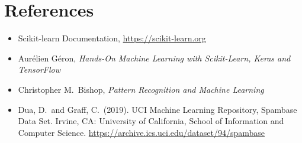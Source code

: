 \documentclass[11pt]{article}
\begin{document}
\section*{References}
\begin{itemize}
    \item Scikit-learn Documentation, \url{https://scikit-learn.org}
    \item Aur\'elien G\'eron, \emph{Hands-On Machine Learning with Scikit-Learn, Keras
    and TensorFlow}
    \item Christopher M.\ Bishop, \emph{Pattern Recognition and Machine Learning}
    \item Dua, D.\ and Graff, C.\ (2019). UCI Machine Learning Repository, Spambase
    Data Set. Irvine, CA: University of California, School of Information and Computer
    Science. \url{https://archive.ics.uci.edu/dataset/94/spambase}
\end{itemize}
\end{document}

